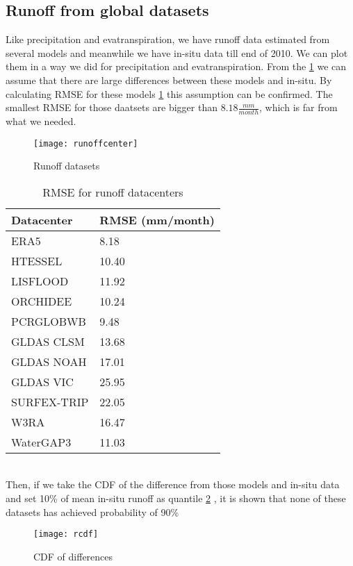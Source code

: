 \subsection{Runoff from global datasets}
Like precipitation and evatranspiration, we have runoff data estimated from several models and meanwhile we have in-situ data till end of 2010. We can plot them in a way we did for precipitation and evatranspiration. From the \ref{fig:rcenter} we can assume that there are large differences between these models and in-situ. By calculating RMSE for these models \ref{tab:rmse} this assumption can be confirmed. The smallest RMSE for those daatsets are bigger than $8.18 \frac{mm}{month}$, which is far from what we needed.
\begin{figure}[htbp]
	\centering
	\texttt{[image: runoffcenter]} %
	\caption{Runoff datasets} 
	\label{fig:rcenter}
\end{figure}
\begin{table}[htbp]\label{tab:rmse} \centering
	\begin{tabular}{|l|l|}
		\hline
		Datacenter  & RMSE (mm/month) \\ \hline
		ERA5        & 8.18  \\ \hline
		HTESSEL     & 10.40 \\ \hline
		LISFLOOD    & 11.92 \\ \hline
		ORCHIDEE    & 10.24 \\ \hline
		PCRGLOBWB   & 9.48  \\ \hline
		GLDAS CLSM  & 13.68 \\ \hline
		GLDAS NOAH  & 17.01 \\ \hline
		GLDAS VIC   & 25.95 \\ \hline
		SURFEX-TRIP & 22.05 \\ \hline
		W3RA        & 16.47 \\ \hline
		WaterGAP3   & 11.03 \\ \hline
	\end{tabular}
	\caption{RMSE for runoff datacenters}
\end{table}\\
Then, if we take the CDF of the difference from those models and in-situ data and set 10\% of mean in-situ runoff as quantile \ref{fig:rcdf} , it is shown that none of these datasets has achieved probability of 90\%
\begin{figure}[htbp]
	\centering
	\texttt{[image: rcdf]} %
	\caption{CDF of differences} 
	\label{fig:rcdf}
\end{figure}\\
